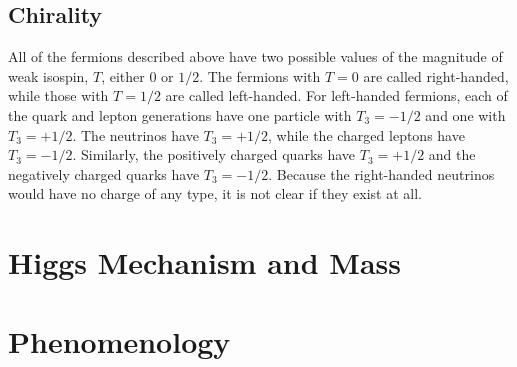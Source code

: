 \subsection{Chirality}

All of the fermions described above have two possible values of the magnitude of weak isospin, $T$, either $0$ or $1/2$.
The fermions with $T = 0$ are called right-handed, while those with $T=1/2$ are called left-handed.
For left-handed fermions, each of the quark and lepton generations have one particle with $T_3 = -1/2$ and one with $T_3 = +1/2$.
The neutrinos have $T_3 = +1/2$, while the charged leptons have $T_3 = -1/2$.
Similarly, the positively charged quarks have $T_3 = +1/2$ and the negatively charged quarks have $T_3 = -1/2$.
Because the right-handed neutrinos would have no charge of any type, it is not clear if they exist at all.


\section{Higgs Mechanism and Mass}

\section{Phenomenology}




%
%
%


